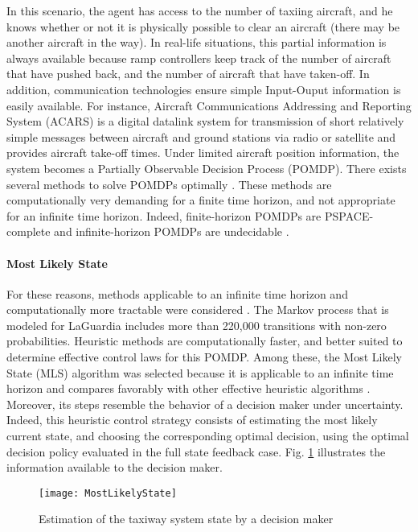 \documentclass[letterpaper]{article}
\begin{document}
In this scenario, the agent has access to the number of taxiing aircraft, and he knows whether or not it is physically possible to clear an 
aircraft (there may be another aircraft in the way). In real-life situations, this partial information is always available because ramp 
controllers keep track of the number of aircraft that have pushed back, and the number of aircraft that have taken-off.
 In addition, communication technologies ensure simple Input-Ouput information is easily available. For instance, Aircraft Communications 
 Addressing and Reporting System (ACARS) is a digital datalink system for transmission of short relatively simple messages between aircraft 
 and ground stations via radio or satellite and provides aircraft take-off times.
  Under limited aircraft position information, the system becomes a Partially Observable Decision Process (POMDP). There exists several methods
   to solve POMDPs optimally \cite{Cassandra1996,Cassandra1997,Sondik1971,Kaelbling1998}.
  These methods are computationally very demanding for a finite time horizon, and not appropriate for an infinite time horizon. Indeed, finite-horizon 
  POMDPs are PSPACE-complete \cite{Papadimitriou1987} and infinite-horizon POMDPs are undecidable \cite{Madani1999}.

\paragraph{Most Likely State}

For these reasons, methods applicable to an infinite time horizon and computationally more tractable were considered \cite{Cassandra1996}. 
The Markov process that is modeled for LaGuardia includes more than 220,000 transitions with non-zero probabilities. 
Heuristic methods are computationally faster, and better suited to determine effective control laws for this POMDP.
 Among these, the Most Likely State (MLS) algorithm was selected because it is applicable to an infinite time horizon and 
 compares favorably with other effective heuristic algorithms \cite{Cassandra1996}. 
 Moreover, its steps resemble the behavior of a decision maker under uncertainty. 
 Indeed, this heuristic control strategy consists of estimating the most likely current state, and choosing the corresponding optimal decision, using the optimal decision policy evaluated in the full state feedback case. Fig. \ref{MostLikelyState} illustrates the information available to the decision maker.\\

\begin{figure}[ht]
\centering
\texttt{[image: MostLikelyState]}
\caption{Estimation of the taxiway system state by a decision maker}
\label{MostLikelyState}
\end{figure}
\end{document}
